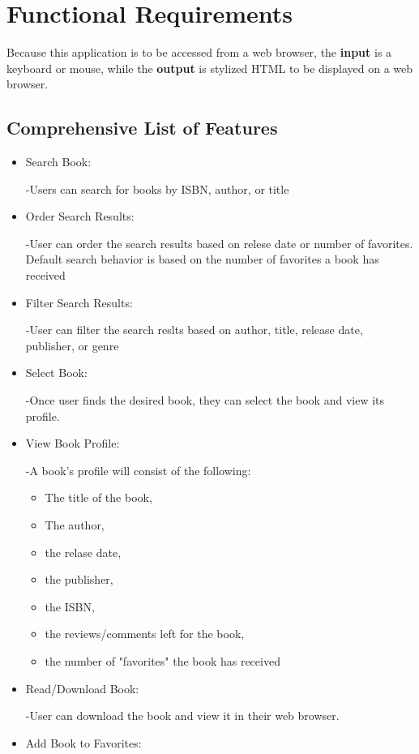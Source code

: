 \documentclass[letter, 12pt, titlepage]{article}
\begin{document}
\section{Functional Requirements}
		Because this application is to be accessed from a web browser, the \textbf{input} is a keyboard or mouse, while the \textbf{output} is stylized HTML to be displayed on a web browser. 

	\subsection{Comprehensive List of Features}
	\begin{itemize}

	\item	Search Book:

			-Users can search for books by ISBN, author, or title
	\item	Order Search Results:

			-User can order the search results based on relese date or number of favorites. Default search behavior is based on the number of favorites a book has received

	\item	Filter Search Results:

			-User can filter the search reslts based on author, title, release date, publisher, or genre
	\item	Select Book:

			-Once user finds the desired book, they can select the book and view its profile.
	\item	View Book Profile:

			-A book's profile will consist of the following:
			\begin{itemize}
				\item The title of the book,
				\item The author,
				\item the relase date,
				\item the publisher,
				\item the ISBN,
				\item the reviews/comments left for the book,
				\item the number of "favorites" the book has received
			\end{itemize}

	\item Read/Download Book:

		-User can download the book and view it in their web browser.
	\item Add Book to Favorites:


\end{itemize}
\end{document}
